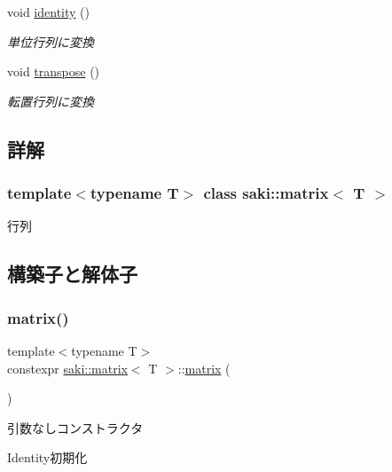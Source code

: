 \begin{DoxyCompactItemize}
void \mbox{\hyperlink{classsaki_1_1matrix_a9f7f8909ee94f44e91faca871f57b936}{identity}} ()
\begin{DoxyCompactList}\small\item\em 単位行列に変換 \end{DoxyCompactList}\item 
void \mbox{\hyperlink{classsaki_1_1matrix_a95e01e24e45757c1e45b5af25273a8fa}{transpose}} ()
\begin{DoxyCompactList}\small\item\em 転置行列に変換 \end{DoxyCompactList}\end{DoxyCompactItemize}


\subsection{詳解}
\subsubsection*{template$<$typename T$>$\newline
class saki\+::matrix$<$ T $>$}

行列 

\subsection{構築子と解体子}
\mbox{\label{classsaki_1_1matrix_aca5102e0cdaedc779d668597d03baf10}} 
\subsubsection{\texorpdfstring{matrix()}{matrix()}\hspace{0.1cm}{\footnotesize\ttfamily [1/6]}}
{\footnotesize\ttfamily template$<$typename T$>$ \\
constexpr \mbox{\hyperlink{classsaki_1_1matrix}{saki\+::matrix}}$<$ T $>$\+::\mbox{\hyperlink{classsaki_1_1matrix}{matrix}} (\begin{DoxyParamCaption}{ }\end{DoxyParamCaption})\hspace{0.3cm}{\ttfamily [inline]}}



引数なしコンストラクタ 

Identity初期化 \mbox{\label{classsaki_1_1matrix_a55edebaa14a4a0ea6b6f263ebe9950f4}} 
